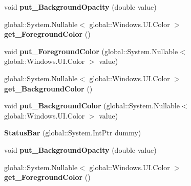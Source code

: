 \begin{DoxyCompactItemize}
void {\bfseries put\+\_\+\+Background\+Opacity} (double value)
\item 
\mbox{\label{class_windows_1_1_u_i_1_1_view_management_1_1_status_bar_a75d85c386b8ab944ec2aa2478a574562}} 
global\+::\+System.\+Nullable$<$ global\+::\+Windows.\+U\+I.\+Color $>$ {\bfseries get\+\_\+\+Foreground\+Color} ()
\item 
\mbox{\label{class_windows_1_1_u_i_1_1_view_management_1_1_status_bar_a870c24a2f4b4920a961161ce6662d40b}} 
void {\bfseries put\+\_\+\+Foreground\+Color} (global\+::\+System.\+Nullable$<$ global\+::\+Windows.\+U\+I.\+Color $>$ value)
\item 
\mbox{\label{class_windows_1_1_u_i_1_1_view_management_1_1_status_bar_a913df88438ec0972e82cf1b25b142912}} 
global\+::\+System.\+Nullable$<$ global\+::\+Windows.\+U\+I.\+Color $>$ {\bfseries get\+\_\+\+Background\+Color} ()
\item 
\mbox{\label{class_windows_1_1_u_i_1_1_view_management_1_1_status_bar_a6ecff49f6682ca50e73617ccc3a605c7}} 
void {\bfseries put\+\_\+\+Background\+Color} (global\+::\+System.\+Nullable$<$ global\+::\+Windows.\+U\+I.\+Color $>$ value)
\item 
\mbox{\label{class_windows_1_1_u_i_1_1_view_management_1_1_status_bar_a65d3147572b09fbe272cd6647bfd1e34}} 
{\bfseries Status\+Bar} (global\+::\+System.\+Int\+Ptr dummy)
\item 
\mbox{\label{class_windows_1_1_u_i_1_1_view_management_1_1_status_bar_a6ab4fd00fb5d69e32bc38be43009139d}} 
void {\bfseries put\+\_\+\+Background\+Opacity} (double value)
\item 
\mbox{\label{class_windows_1_1_u_i_1_1_view_management_1_1_status_bar_a75d85c386b8ab944ec2aa2478a574562}} 
global\+::\+System.\+Nullable$<$ global\+::\+Windows.\+U\+I.\+Color $>$ {\bfseries get\+\_\+\+Foreground\+Color} ()
\item 

\end{DoxyCompactItemize}
